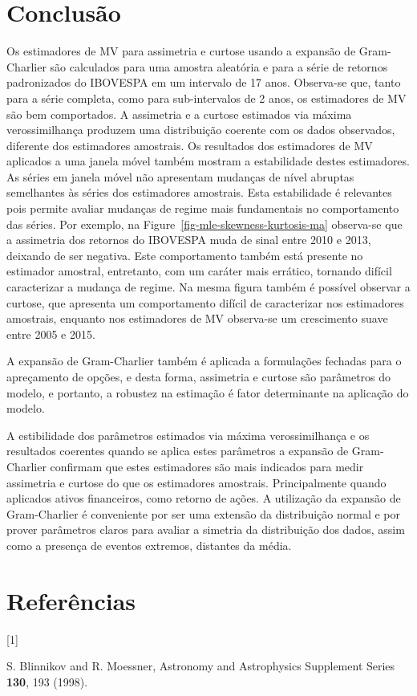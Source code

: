 \documentclass[
  letterpaper,
  DIV=11,
  numbers=noendperiod]{scrartcl}
\newlength{\cslhangindent}
\newlength{\csllabelwidth}
\newenvironment{CSLReferences}[2] %
 {\begin{list}{}{%
  \setlength{\itemindent}{0pt}
  \setlength{\leftmargin}{0pt}
  \setlength{\parsep}{0pt}
  \ifodd #1
   \setlength{\leftmargin}{\cslhangindent}
   \setlength{\itemindent}{-1\cslhangindent}
  \fi
  \setlength{\itemsep}{#2\baselineskip}}}
 {\end{list}}
\newcommand{\CSLLeftMargin}[1]{\parbox[t]{\csllabelwidth}{\strut#1\strut}}
\newcommand{\CSLRightInline}[1]{\parbox[t]{\linewidth - \csllabelwidth}{\strut#1\strut}}
\begin{document}
\section{Conclusão}\label{conclusuxe3o}

Os estimadores de MV para assimetria e curtose usando a expansão de
Gram-Charlier são calculados para uma amostra aleatória e para a série
de retornos padronizados do IBOVESPA em um intervalo de 17 anos.
Observa-se que, tanto para a série completa, como para sub-intervalos de
2 anos, os estimadores de MV são bem comportados. A assimetria e a
curtose estimados via máxima verossimilhança produzem uma distribuição
coerente com os dados observados, diferente dos estimadores amostrais.
Os resultados dos estimadores de MV aplicados a uma janela móvel também
mostram a estabilidade destes estimadores. As séries em janela móvel não
apresentam mudanças de nível abruptas semelhantes às séries dos
estimadores amostrais. Esta estabilidade é relevantes pois permite
avaliar mudanças de regime mais fundamentais no comportamento das
séries. Por exemplo, na Figure~\ref{fig-mle-skewness-kurtosis-ma}
observa-se que a assimetria dos retornos do IBOVESPA muda de sinal entre
2010 e 2013, deixando de ser negativa. Este comportamento também está
presente no estimador amostral, entretanto, com um caráter mais
errático, tornando difícil caracterizar a mudança de regime. Na mesma
figura também é possível observar a curtose, que apresenta um
comportamento difícil de caracterizar nos estimadores amostrais,
enquanto nos estimadores de MV observa-se um crescimento suave entre
2005 e 2015.

A expansão de Gram-Charlier também é aplicada a formulações fechadas
para o apreçamento de opções, e desta forma, assimetria e curtose são
parâmetros do modelo, e portanto, a robustez na estimação é fator
determinante na aplicação do modelo.

A estibilidade dos parâmetros estimados via máxima verossimilhança e os
resultados coerentes quando se aplica estes parâmetros a expansão de
Gram-Charlier confirmam que estes estimadores são mais indicados para
medir assimetria e curtose do que os estimadores amostrais.
Principalmente quando aplicados ativos financeiros, como retorno de
ações. A utilização da expansão de Gram-Charlier é conveniente por ser
uma extensão da distribuição normal e por prover parâmetros claros para
avaliar a simetria da distribuição dos dados, assim como a presença de
eventos extremos, distantes da média.

\section*{Referências}\label{referuxeancias}

\label{refs}
\begin{CSLReferences}{0}{0}
\CSLLeftMargin{{[}1{]} }%
\CSLRightInline{S. Blinnikov and R. Moessner, Astronomy and Astrophysics
Supplement Series \textbf{130}, 193 (1998).}

\end{CSLReferences}
\end{document}

